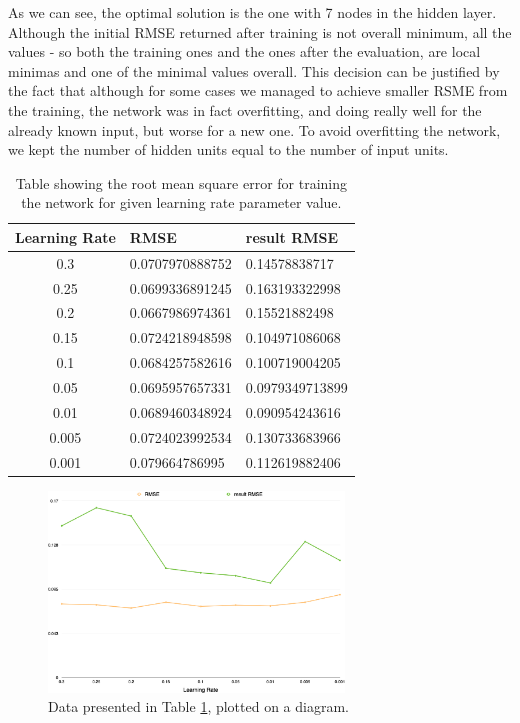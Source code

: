 As we can see, the optimal solution is the one with 7 nodes in the hidden layer. Although the initial RMSE returned after training is not overall minimum, all the values - so both the training ones and the ones after the evaluation, are local minimas and one of the minimal values overall. This decision can be justified by the fact that although for some cases we managed to achieve smaller RSME from the training, the network was in fact overfitting, and doing really well for the already known input, but worse for a new one.
To avoid overfitting the network, we kept the number of hidden units equal to the number of input units. 

\begin{table}
\begin{center}
\begin{tabular} {| c | l | l |} \hline
 Learning Rate & RMSE & result RMSE \\  \hline \hline
 0.3 & 0.0707970888752 & 0.14578838717 \\ \hline
 0.25 & 0.0699336891245 & 0.163193322998 \\ \hline
 0.2 &  0.0667986974361 & 0.15521882498 \\ \hline
 0.15 & 0.0724218948598 & 0.104971086068 \\ \hline
 0.1 & 0.0684257582616 & 0.100719004205 \\ \hline
 0.05 & 0.0695957657331 & 0.0979349713899 \\ \hline
 0.01 & 0.0689460348924 & 0.090954243616 \\ \hline
 0.005 & 0.0724023992534 & 0.130733683966 \\ \hline
 0.001 &  0.079664786995 & 0.112619882406 \\ \hline
\end{tabular}
\caption{Table showing the root mean square error for training the network for given learning rate parameter value.}
\label{table:learningrate}
\end{center}
\end{table}

\begin{figure}[b]
	\centering
   \includegraphics[width=0.7\textwidth]{Figures/learningrate}
\caption{Data presented in Table \ref{table:learningrate}, plotted on a diagram.}
\end{figure}


